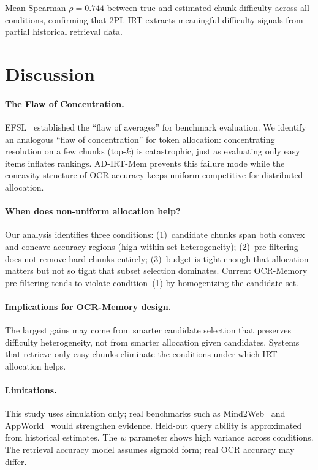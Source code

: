 \documentclass{article}
\begin{document}
Mean Spearman $\rho = 0.744$ between true and estimated chunk difficulty across all conditions, confirming that 2PL IRT extracts meaningful difficulty signals from partial historical retrieval data.

\section{Discussion}

\paragraph{The Flaw of Concentration.} EFSL~\citep{kang2026efsl} established the ``flaw of averages'' for benchmark evaluation. We identify an analogous ``flaw of concentration'' for token allocation: concentrating resolution on a few chunks (top-$k$) is catastrophic, just as evaluating only easy items inflates rankings. AD-IRT-Mem prevents this failure mode while the concavity structure of OCR accuracy keeps uniform competitive for distributed allocation.

\paragraph{When does non-uniform allocation help?} Our analysis identifies three conditions: (1)~candidate chunks span both convex and concave accuracy regions (high within-set heterogeneity); (2)~pre-filtering does not remove hard chunks entirely; (3)~budget is tight enough that allocation matters but not so tight that subset selection dominates. Current OCR-Memory pre-filtering tends to violate condition~(1) by homogenizing the candidate set.

\paragraph{Implications for OCR-Memory design.} The largest gains may come from smarter candidate selection that preserves difficulty heterogeneity, not from smarter allocation given candidates. Systems that retrieve only easy chunks eliminate the conditions under which IRT allocation helps.

\paragraph{Limitations.}
This study uses simulation only; real benchmarks such as Mind2Web~\citep{deng2023mind2web} and AppWorld~\citep{trivedi2024appworld} would strengthen evidence. Held-out query ability is approximated from historical estimates. The $w$ parameter shows high variance across conditions. The retrieval accuracy model assumes sigmoid form; real OCR accuracy may differ.
\end{document}
